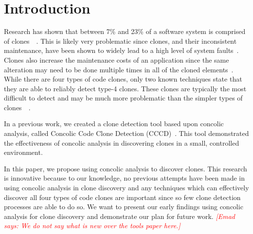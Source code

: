 \documentclass{sig-alternate}
\newcommand{\emad}[1]{\textcolor{red}{{\it [Emad says: #1]}}}
\begin{document}





\section{Introduction}

Research has shown that between 7\% and 23\% of a software system is comprised of clones~\cite{Roy:2008:ESF:1447565.1448036}~\cite{Baker:1995:FDN:832303.836911}. This is likely very problematic since clones, and their inconsistent maintenance, have been shown to widely lead to a high level of system faults~\cite{Juergens:2009:CCM:1555001.1555062}. Clones also increase the maintenance costs of an application since the same alteration may need to be done multiple times in all of the cloned elements~\cite{Li:2006:CFC:1128600.1128814}. While there are four types of code clones, only two known techniques state that they are able to reliably detect type-4 clones. These clones are typically the most difficult to detect and may be much more problematic than the simpler types of clones~\cite{Yuan:2011:CCM:2114489.2114766}~\cite{Roy07asurvey}.



In a previous work, we created a clone detection tool based upon concolic analysis, called Concolic Code Clone Detection (CCCD)~\cite{wcre2013}. This tool demonstrated the effectiveness of concolic analysis in discovering clones in a small, controlled environment. 

In this paper, we propose using concolic analysis to discover clones. This research is innovative because to our knowledge, no previous attempts have been made in using concolic analysis in clone discovery and any techniques which can effectively discover all four types of code clones are important since so few clone detection processes are able to do so. We want to present our early findings using concolic analysis for clone discovery and demonstrate our plan for future work. \emad{We do not say what is new over the tools paper here.}
\end{document}

